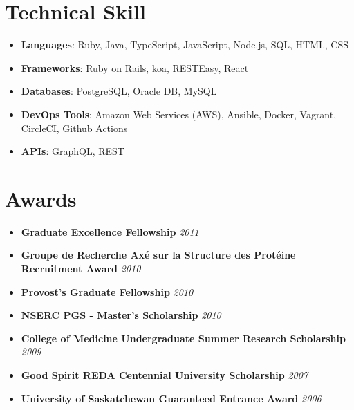 \documentclass[letterpaper,11pt]{article}
\newcommand{\technology}[2]{
	\item[]
	  \textbf{#1}: #2
}
\newcommand{\award}[2]{
	\item[]
	  \textbf{#1} \hfill \textit{#2}
}
\begin{document}
\section{Technical Skill}
 \begin{itemize}[leftmargin=*,noitemsep,topsep=0pt]
   \technology{Languages}{Ruby, Java, TypeScript, JavaScript, Node.js, SQL, HTML, CSS}
   \technology{Frameworks}{Ruby on Rails, koa, RESTEasy, React}
   \technology{Databases}{PostgreSQL, Oracle DB, MySQL}
   \technology{DevOps Tools}{Amazon Web Services (AWS), Ansible, Docker, Vagrant, CircleCI, Github Actions}
   \technology{APIs}{GraphQL, REST}
 \end{itemize}

\section{Awards}
 \begin{itemize}[leftmargin=*,noitemsep,topsep=0pt]
	\award{Graduate Excellence Fellowship}{2011}
	\award{Groupe de Recherche Axé sur la Structure des Protéine Recruitment Award}{2010}
	\award{Provost’s Graduate Fellowship}{2010}
	\award{NSERC PGS - Master’s Scholarship}{2010}
	\award{College of Medicine Undergraduate Summer Research Scholarship}{2009}
	\award{Good Spirit REDA Centennial University Scholarship}{2007}
	\award{University of Saskatchewan Guaranteed Entrance Award}{2006}
  \end{itemize}

\end{document}
